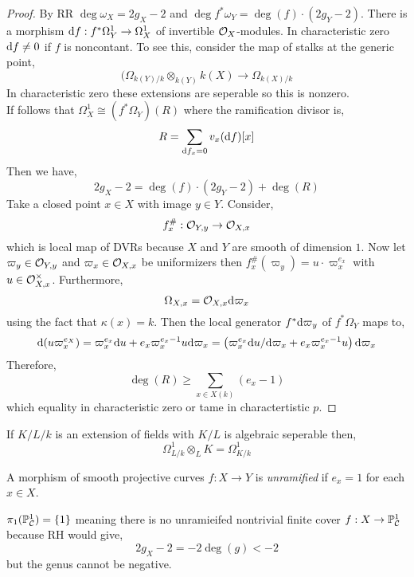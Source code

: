 \documentclass[12pt]{article}
\begin{document}
\begin{proof}
By RR $\deg{\omega_X} = 2 g_X - 2$ and $\deg{f^* \omega_Y} = \deg{(f)} \cdot (2 g_Y - 2)$. 
There is a morphism $\mathrm{d}{f} : f^* \Omega_Y^1 \to \Omega_X^1$ of invertible $\mathcal{O}_{X}$-modules. In characteristic zero $\mathrm{d}{f} \neq 0$ if $f$ is noncontant. To see this, consider the map of stalks at the generic point,
\[ (\Omega_{k(Y) / k} \otimes_{k(Y)} k(X) \to \Omega_{k(X) / k} \]
In characteristic zero these extensions are seperable so this is nonzero. 
\bigskip\\
If follows that $\Omega_X^1 \cong (f^* \Omega_Y)(R)$ where the ramification divisor is,
\[ R = \sum_{\mathrm{d}{f_x} = 0} v_x(\mathrm{d}{f}) [x] \]
Then we have,
\[ 2 g_X - 2 = \deg{(f)} \cdot (2 g_Y - 2) + \deg{(R)} \]
Take a closed point $x \in X$ with image $y \in Y$. Consider,
\[ f^\#_x : \mathcal{O}_{Y, y} \to \mathcal{O}_{X, x} \]
which is local map of DVRs because $X$ and $Y$ are smooth of dimension $1$. Now let $\varpi_y \in \mathcal{O}_{Y, y}$ and $\varpi_x \in \mathcal{O}_{X, x}$ be uniformizers then $f^\#_x(\varpi_y) = u \cdot \varpi_x^{e_x}$ with $u \in \mathcal{O}_{X, x}^\times$. Furthermore,
\[ \Omega_{X,x} = \mathcal{O}_{X, x} \mathrm{d}{\varpi_x} \]
using the fact that $\kappa(x) = k$. Then the local generator $f^* \mathrm{d}{\varpi_y}$ of $f^* \Omega_Y$ maps to,
\begin{align*}
\mathrm{d}{(u \varpi_x^{e_X})} = \varpi_x^{e_x} \mathrm{d}{u} + e_x \varpi_x^{e_x - 1} u \mathrm{d}{\varpi_x} = \left( \varpi_x^{e_x} \mathrm{d}{u} / \mathrm{d}{\varpi_x} + e_x \varpi_x^{e_x - 1} u \right) \mathrm{d}{\varpi_x} 
\end{align*}
Therefore, 
\[ \deg{(R)} \ge \sum_{x \in X(k)} (e_x - 1) \]
which equality in characteristic zero or tame in charactertistic $p$. 
\end{proof}


\begin{lemma}
If $K / L / k$ is an extension of fields with $K / L$ is algebraic seperable then,
\[ \Omega^1_{L / k} \otimes_L K = \Omega^1_{K / k} \]  
\end{lemma}

\begin{definition}
A morphism of smooth projective curves $f : X \to Y$ is \textit{unramified} if $e_x = 1$ for each $x \in X$.
\end{definition}

\begin{example}
$\pi_1(\mathbb{P}^1_{\mathcal{C}}) = \{1\}$ meaning there is no unramieifed nontrivial finite cover $f : X \to \mathbb{P}^1_{\mathcal{C}}$ because RH would give,
\[ 2 g_X - 2 = -2 \deg{(g)} < - 2 \]
but the genus cannot be negative. 
\end{example}
\end{document}
